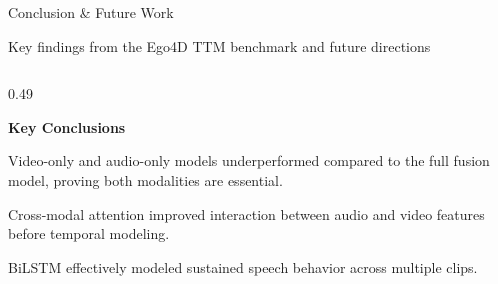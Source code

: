 \documentclass[aspectratio=169, 10pt]{beamer}
\begin{document}
\begin{frame}{Conclusion \& Future Work}

\textcolor{NavyBlue}{\footnotesize
Key findings from the Ego4D TTM benchmark and future directions}

\vspace{2pt}

\small

\begin{columns}[T,onlytextwidth]

\begin{column}{0.49\textwidth}

\textcolor{NavyBlue}{\small\bfseries Key Conclusions}

\vspace{2pt}

\begin{tcolorbox}[
bluecard,
title={\small Multimodal Fusion},
boxsep=1pt,
left=2pt,right=2pt,
top=2pt,bottom=2pt]

\footnotesize
Video-only and audio-only models underperformed compared to the full fusion model, proving both modalities are essential.

\end{tcolorbox}

\vspace{2pt}

\begin{tcolorbox}[
tealcard,
title={\small Cross-Modal Attention},
boxsep=1pt,
left=2pt,right=2pt,
top=2pt,bottom=2pt]

\footnotesize
Cross-modal attention improved interaction between audio and video features before temporal modeling.

\end{tcolorbox}

\vspace{2pt}

\begin{tcolorbox}[
purplecard,
title={\small Temporal Context},
boxsep=1pt,
left=2pt,right=2pt,
top=2pt,bottom=2pt]

\footnotesize
BiLSTM effectively modeled sustained speech behavior across multiple clips.

\end{tcolorbox}

\vspace{2pt}

\begin{tcolorbox}[
orangecard,
title={\small Precision vs Recall},
boxsep=1pt,
left=2pt,right=2pt,
top=2pt,bottom=2pt]


\end{tcolorbox}
\end{column}
\end{columns}
\end{frame}
\end{document}
